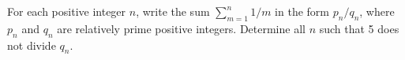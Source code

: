 For each positive integer $n$, write the sum $\sum_{m=1}^n
1/m$ in the form $p_n/q_n$, where $p_n$ and $q_n$ are relatively prime
positive integers.  Determine all $n$ such that 5 does not divide $q_n$.
